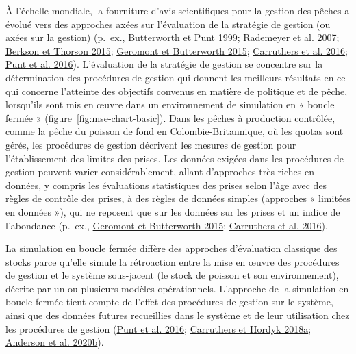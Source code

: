 \documentclass[french,11pt]{book}
\begin{document}
À l'échelle mondiale, la fourniture d'avis scientifiques pour la gestion des pêches a évolué vers des approches axées sur l'évaluation de la stratégie de gestion (ou axées sur la gestion) (p.~ex., \protect\hyperlink{ref-butterworth1999}{Butterworth et Punt 1999}; \protect\hyperlink{ref-rademeyer2007}{Rademeyer et al. 2007}; \protect\hyperlink{ref-berkson2015}{Berkson et Thorson 2015}; \protect\hyperlink{ref-geromont2015}{Geromont et Butterworth 2015}; \protect\hyperlink{ref-carruthers2016}{Carruthers et al. 2016}; \protect\hyperlink{ref-punt2016}{Punt et al. 2016}). L'évaluation de la stratégie de gestion se concentre sur la détermination des procédures de gestion qui donnent les meilleurs résultats en ce qui concerne l'atteinte des objectifs convenus en matière de politique et de pêche, lorsqu'ils sont mis en œuvre dans un environnement de simulation en « boucle fermée » (figure~\ref{fig:mse-chart-basic}). Dans les pêches à production contrôlée, comme la pêche du poisson de fond en Colombie-Britannique, où les quotas sont gérés, les procédures de gestion décrivent les mesures de gestion pour l'établissement des limites des prises. Les données exigées dans les procédures de gestion peuvent varier considérablement, allant d'approches très riches en données, y compris les évaluations statistiques des prises selon l'âge avec des règles de contrôle des prises, à des règles de données simples (approches « limitées en données »), qui ne reposent que sur les données sur les prises et un indice de l'abondance (p.~ex., \protect\hyperlink{ref-geromont2015}{Geromont et Butterworth 2015}; \protect\hyperlink{ref-carruthers2016}{Carruthers et al. 2016}).

La simulation en boucle fermée diffère des approches d'évaluation classique des stocks parce qu'elle simule la rétroaction entre la mise en œuvre des procédures de gestion et le système sous-jacent (le stock de poisson et son environnement), décrite par un ou plusieurs modèles opérationnels. L'approche de la simulation en boucle fermée tient compte de l'effet des procédures de gestion sur le système, ainsi que des données futures recueillies dans le système et de leur utilisation chez les procédures de gestion (\protect\hyperlink{ref-punt2016}{Punt et al. 2016}; \protect\hyperlink{ref-carruthers2018}{Carruthers et Hordyk 2018a}; \protect\hyperlink{ref-anderson2020gfmp}{Anderson et al. 2020b}).
\end{document}
